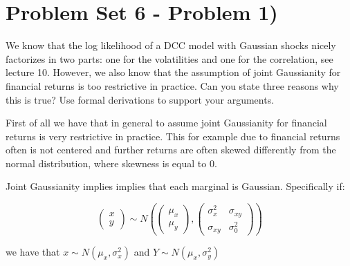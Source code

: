 \documentclass{article}
\begin{document}
\section{Problem Set 6 - Problem 1)}

\begin{tcolorbox}[colback=white]
We know that the log likelihood of a DCC model with Gaussian shocks nicely factorizes in two parts: one for the volatilities and one for the correlation, see lecture 10. However, we also know that the assumption of joint Gaussianity for financial returns is too restrictive in practice. Can you state three reasons why this is true? Use formal derivations to support your arguments.
\end{tcolorbox}

First of all we have that in general to assume joint Gaussianity for financial returns is very restrictive in practice. This for example due to financial returns often is not centered and further returns are often skewed differently from the normal distribution, where skewness is equal to $0$. 

\bigskip

Joint Gaussianity implies implies that each marginal is Gaussian. Specifically if:

$$
\left(\begin{array}{l}
x \\
y
\end{array}\right) \sim N\left(\left(\begin{array}{l}
\mu_{x} \\
\mu_{y}
\end{array}\right),\left(\begin{array}{ll}
\sigma_{x}^{2} & \sigma_{x y} \\
\sigma_{x y} & \sigma_{0}^{2}
\end{array}\right)\right)
$$

we have that $x \sim N\left(\mu_{x}, \sigma_{x}^{2}\right)$ and $Y \sim N\left(\mu_{x}, \sigma_{y}^{2}\right)$ 
\end{document}
